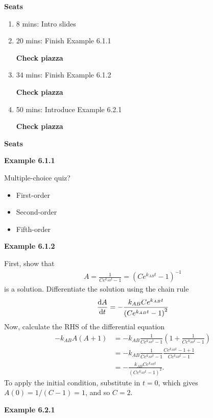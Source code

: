 \textbf{Seats}
\begin{enumerate}
    \item 8 mins: Intro slides \par
    \item 20 mins: Finish Example 6.1.1 \par
    \textbf{Check piazza}
    \item 34 mins: Finish Example 6.1.2 \par
    \textbf{Check piazza}
    \item 50 mins: Introduce Example 6.2.1 \par
    \textbf{Check piazza}
\end{enumerate}
\textbf{Seats}

\vspace{10mm}
\textbf{Example 6.1.1}

Multiple-choice quiz?
\begin{itemize}
\item First-order
\item Second-order
\item Fifth-order
\end{itemize}

\vspace{10mm}
\textbf{Example 6.1.2}

First, show that 
\begin{align*}
A = \frac{1}{C e^{k_{AB} t} - 1} = \left(C e^{k_{AB} t} - 1\right)^{-1}
\end{align*}
is a solution. Differentiate the solution using the chain rule
\begin{align*}
\frac{{\rm d} A}{{\rm d} t} = - \frac{ k_{AB} C e^{k_{AB} t}}{ \left(C e^{k_{AB} t} - 1\right)^{2}}
\end{align*}
Now, calculate the RHS of the differential equation
\begin{align*}
-k_{AB}A(A+1) &=  -k_{AB} \frac{1}{C e^{k_{AB} t} - 1} \left(1 + \frac{1}{C e^{k_{AB} t} - 1} \right) \\
&= -k_{AB} \frac{1}{C e^{k_{AB} t} - 1} \frac{C e^{k_{AB} t} - 1 + 1}{C e^{k_{AB} t} - 1} \\
&=  - \frac{ k_{AB} C e^{k_{AB} t}}{ \left(C e^{k_{AB} t} - 1\right)^{2}}.
\end{align*}
To apply the initial condition, substitute in $t=0$, which gives $A(0) = 1/(C-1) = 1$, and so $C=2$.


\vspace{10mm}
\textbf{Example 6.2.1}


